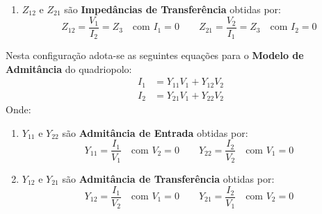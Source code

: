 \documentclass{article}
\begin{document}
\begin{theorem}
\begin{enumerate}
        \item $Z_{12}$ e $Z_{21}$ são \textbf{Impedâncias de Transferência} obtidas por:
        \begin{equation}
            Z_{12} = \frac{V_1}{I_2} = Z_3\quad\text{com $I_1 = 0$} \qquad
            Z_{21} = \frac{V_2}{I_1} = Z_3\quad\text{com $I_2 = 0$}
        \end{equation}
    \end{enumerate}
    Nesta configuração adota-se as seguintes equações para o \textbf{Modelo de Admitância} do quadriopolo:
    \begin{align}
        I_{1} &= Y_{11}V_{1} + Y_{12}V_{2}\\[1.5mm]
        I_{2} &= Y_{21}V_{1} + Y_{22}V_{2}
    \end{align}
    Onde:
    \begin{enumerate}
        \item $Y_{11}$ e $Y_{22}$ são \textbf{Admitância de Entrada} obtidas por:
        \begin{equation}
            Y_{11} = \frac{I_1}{V_1}\quad\text{com $V_2 = 0$} \qquad
            Y_{22} = \frac{I_2}{V_2}\quad\text{com $V_1 = 0$}
        \end{equation}

        \item $Y_{12}$ e $Y_{21}$ são \textbf{Admitância de Transferência} obtidas por:
        \begin{equation}
            Y_{12} = \frac{I_1}{V_2}\quad\text{com $V_1 = 0$} \qquad
            Y_{21} = \frac{I_2}{V_1}\quad\text{com $V_2 = 0$}
        \end{equation}
    \end{enumerate}
\end{theorem}
\end{document}
